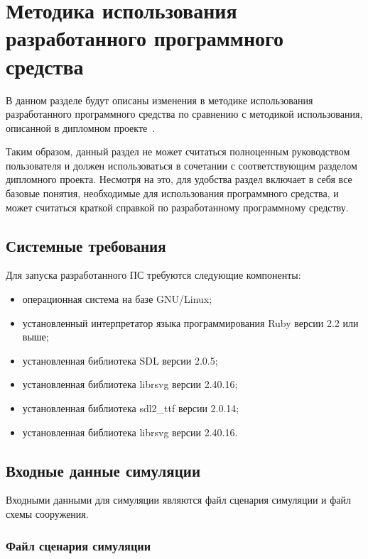 \section{Методика использования разработанного программного средства}
\label{sec:manual}

В данном разделе будут описаны изменения в методике использования разработанного программного средства по сравнению
с методикой использования, описанной в дипломном проекте~\cite{my_diploma}.

Таким образом, данный раздел не может считаться полноценным руководством пользователя и должен
использоваться в сочетании с соответствующим разделом дипломного проекта.
Несмотря на это, для удобства раздел включает в себя все базовые понятия, необходимые для использования программного средства,
и может считаться краткой справкой по разработанному программному средству.

\subsection{Системные требования}
\label{sec:manual:requirements}

Для запуска разработанного ПС требуются следующие компоненты:
\begin{itemize}
  \item операционная система на базе GNU/Linux;
  \item установленный интерпретатор языка программирования Ruby версии 2.2 или выше;
  \item установленная библиотека SDL версии 2.0.5;
  \item установленная библиотека librsvg версии 2.40.16;
  \item установленная библиотека sdl2\_ttf версии 2.0.14;
  \item установленная библиотека librsvg версии 2.40.16.
\end{itemize}

\subsection{Входные данные симуляции}
\label{sec:manual:input}

Входными данными для симуляции являются файл сценария симуляции и файл схемы сооружения.

\subsubsection{Файл сценария симуляции}
\label{sec:manual:input:scenario}

